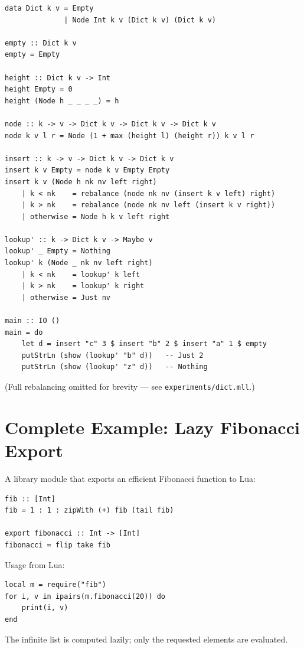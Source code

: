 \documentclass[11pt,a4paper]{article}
\begin{document}
\begin{lstlisting}
data Dict k v = Empty
              | Node Int k v (Dict k v) (Dict k v)

empty :: Dict k v
empty = Empty

height :: Dict k v -> Int
height Empty = 0
height (Node h _ _ _ _) = h

node :: k -> v -> Dict k v -> Dict k v -> Dict k v
node k v l r = Node (1 + max (height l) (height r)) k v l r

insert :: k -> v -> Dict k v -> Dict k v
insert k v Empty = node k v Empty Empty
insert k v (Node h nk nv left right)
    | k < nk    = rebalance (node nk nv (insert k v left) right)
    | k > nk    = rebalance (node nk nv left (insert k v right))
    | otherwise = Node h k v left right

lookup' :: k -> Dict k v -> Maybe v
lookup' _ Empty = Nothing
lookup' k (Node _ nk nv left right)
    | k < nk    = lookup' k left
    | k > nk    = lookup' k right
    | otherwise = Just nv

main :: IO ()
main = do
    let d = insert "c" 3 $ insert "b" 2 $ insert "a" 1 $ empty
    putStrLn (show (lookup' "b" d))   -- Just 2
    putStrLn (show (lookup' "z" d))   -- Nothing
\end{lstlisting}

(Full rebalancing omitted for brevity --- see \texttt{experiments/dict.mll}.)

\section{Complete Example: Lazy Fibonacci Export}

A library module that exports an efficient Fibonacci function to Lua:

\begin{lstlisting}
fib :: [Int]
fib = 1 : 1 : zipWith (+) fib (tail fib)

export fibonacci :: Int -> [Int]
fibonacci = flip take fib
\end{lstlisting}

Usage from Lua:

\begin{lstlisting}[language={}]
local m = require("fib")
for i, v in ipairs(m.fibonacci(20)) do
    print(i, v)
end
\end{lstlisting}

The infinite list is computed lazily; only the requested elements are
evaluated.
\end{document}
